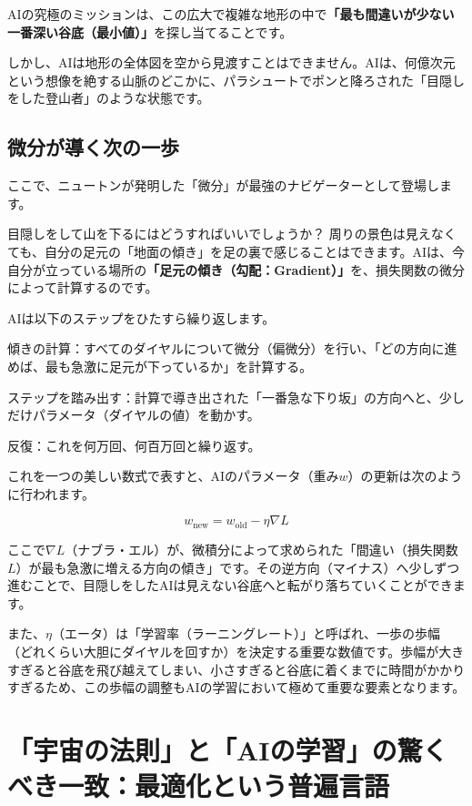 AIの究極のミッションは、この広大で複雑な地形の中で\textbf{「最も間違いが少ない一番深い谷底（最小値）」}を探し当てることです。

しかし、AIは地形の全体図を空から見渡すことはできません。AIは、何億次元という想像を絶する山脈のどこかに、パラシュートでポンと降ろされた「目隠しをした登山者」のような状態です。

\subsection{微分が導く次の一歩}

ここで、ニュートンが発明した「微分」が最強のナビゲーターとして登場します。

目隠しをして山を下るにはどうすればいいでしょうか？ 周りの景色は見えなくても、自分の足元の「地面の傾き」を足の裏で感じることはできます。AIは、今自分が立っている場所の\textbf{「足元の傾き（勾配：Gradient）」}を、損失関数の微分によって計算するのです。

AIは以下のステップをひたすら繰り返します。

傾きの計算：すべてのダイヤルについて微分（偏微分）を行い、「どの方向に進めば、最も急激に足元が下っているか」を計算する。

ステップを踏み出す：計算で導き出された「一番急な下り坂」の方向へと、少しだけパラメータ（ダイヤルの値）を動かす。

反復：これを何万回、何百万回と繰り返す。

これを一つの美しい数式で表すと、AIのパラメータ（重み\(w\)）の更新は次のように行われます。

\[
w_{\mathrm{new}}=w_{\mathrm{old}}-\eta\nabla L
\]

ここで\(\nabla L\)（ナブラ・エル）が、微積分によって求められた「間違い（損失関数\(L\)）が最も急激に増える方向の傾き」です。その逆方向（マイナス）へ少しずつ進むことで、目隠しをしたAIは見えない谷底へと転がり落ちていくことができます。

また、\(\eta\)（エータ）は「学習率（ラーニングレート）」と呼ばれ、一歩の歩幅（どれくらい大胆にダイヤルを回すか）を決定する重要な数値です。歩幅が大きすぎると谷底を飛び越えてしまい、小さすぎると谷底に着くまでに時間がかかりすぎるため、この歩幅の調整もAIの学習において極めて重要な要素となります。

\section{「宇宙の法則」と「AIの学習」の驚くべき一致：最適化という普遍言語}

